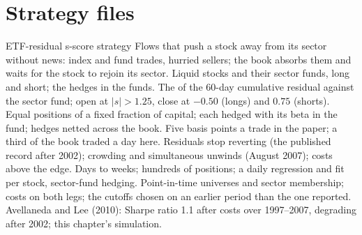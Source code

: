 \section{Strategy files}

\begin{strategyfile}{ETF-residual s-score strategy}\label{strat:s1:residual-and-principal-component-stat-arb:etf}
 Flows that push a stock away from its sector without news: index and fund trades, hurried sellers; the book absorbs them and
waits for the stock to rejoin its sector.
 Liquid stocks and their sector funds, long and short; the hedges in the funds.
 The  of the 60-day cumulative residual against the sector fund; open at $|s| > 1.25$, close at $-0.50$ (longs) and $0.75$ (shorts).
 Equal positions of a fixed fraction of capital; each hedged with its beta in the fund; hedges netted across the book.
 Five basis points a trade in the paper; a third of the book traded a day here.
 Residuals stop reverting (the published record after 2002); crowding and simultaneous unwinds (August 2007); costs above the edge.
 Days to weeks; hundreds of positions; a daily regression and fit per stock, sector-fund hedging.
 Point-in-time universes and sector membership; costs on both legs; the cutoffs chosen on an earlier period than the one reported.
 Avellaneda and Lee (2010): Sharpe ratio 1.1 after costs over 1997--2007, degrading after 2002; this chapter's simulation.
\end{strategyfile}

